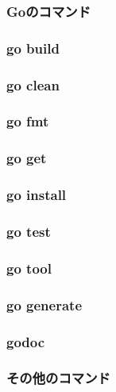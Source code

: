\subsubsection{Goのコマンド}

\subsubsection{go build}

\subsubsection{go clean}

\subsubsection{go fmt}

\subsubsection{go get}

\subsubsection{go install}

\subsubsection{go test}

\subsubsection{go tool}

\subsubsection{go generate}

\subsubsection{godoc}

\subsubsection{その他のコマンド}

